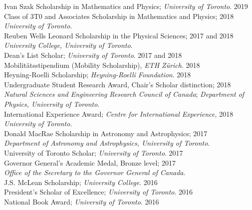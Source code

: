 \documentclass[letterpaper, 11pt]{aq-cv}
\begin{document}
Ivan Szak Scholarship in Mathematics and Physics; \textit{University of Toronto}. \hfill 2019 \\[1ex]
Class of 3T0 and Associates Scholarship in Mathematics and Physics; \hfill 2018 \\ \indent \textit{University of Toronto}.  \\[1ex]
Reuben Wells Leonard Scholarship in the Physical Sciences; \hfill 2017 and 2018 \\ \indent\textit{University College, University of Toronto}. \\[1ex]
Dean's List Scholar; \textit{University of Toronto}. \hfill 2017 and 2018 \\[1ex]
Mobilit\"{a}tsstipendium (Mobility Scholarship), \textit{ETH Z\"{u}rich}. \hfill 2018 \\[1ex]
Heyning-Roelli Scholarship; \textit{Heyning-Roelli Foundation}. \hfill 2018 \\[1ex]
Undergraduate Student Research Award, Chair's Scholar distinction; \hfill 2018 \\
\indent\textit{Natural Sciences and Engineering Research Council of Canada}; \newline\indent \textit{Department of Physics, University of Toronto}.\\[1ex]
International Experience Award; \textit{Centre for International Experience,} \hfill 2018 \\
\indent\textit{University of Toronto}. \\[1ex]
Donald MacRae Scholarship in Astronomy and Astrophysics; \hfill 2017 \\ \indent \textit{Department of Astronomy and Astrophysics, University of Toronto}. \\[1ex]
University of Toronto Scholar; \textit{University of Toronto}. \hfill 2017 \\[1ex]
Governor General's Academic Medal, Bronze level; \hfill 2017 \\ \indent \textit{Office of the Secretary to the Governor General of Canada}. \\[1ex]
J.S. McLean Scholarship; \textit{University College}. \hfill 2016 \\[1ex]
President's Scholar of Excellence; \textit{University of Toronto}. \hfill 2016 \\[1ex]
National Book Award; \textit{University of Toronto}. \hfill 2016 %
\end{document}
